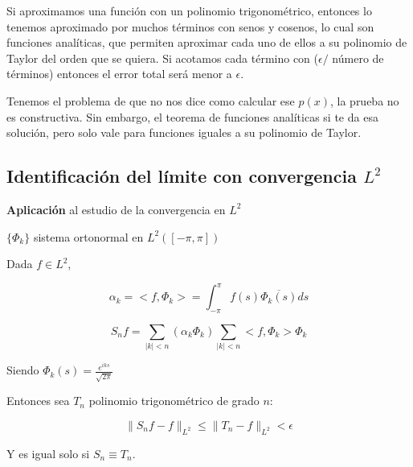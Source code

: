 		Si aproximamos una función con un polinomio trigonométrico, entonces lo tenemos aproximado por muchos términos con senos y cosenos, lo cual son funciones analíticas, que permiten aproximar cada uno de ellos a su polinomio de Taylor del orden que se quiera. Si acotamos cada término con ($\epsilon / $ número de términos) entonces el error total será menor a $\epsilon$.

		Tenemos el problema de que no nos dice como calcular ese $p(x)$, la prueba no es constructiva. Sin embargo, el teorema de funciones analíticas si te da esa solución, pero solo vale para funciones iguales a su polinomio de Taylor.

		\subsection{Identificación del límite con convergencia $L^2$}
		\textbf{Aplicación} al estudio de la convergencia en $L^2$

		$\{\Phi_k\}$ sistema ortonormal en $L^2([-\pi,\pi])$

		Dada $f \in L^2$,

		\[\alpha_k = <f, \Phi_{k}> = \int_{-\pi}^\pi f(s) \overline{\Phi_k(s)} ds  \]

		\[  S_n f = \sum_{|k| < n} (\alpha_k \Phi_k ) \sum_{|k| < n}<f, \Phi_k >\Phi_k \]

		Siendo $\Phi_k(s) = \frac{e^{iks}}{\sqrt{2\pi}}$

		\begin{theorem}

			Entonces sea $T_n$ polinomio trigonométrico de grado $n$:

			\[ \| S_n f - f\|_{L^2} \leq \| T_n - f \|_{L^2} < \epsilon \]

			Y es igual solo si $S_n \equiv T_n$.

		\end{theorem}

